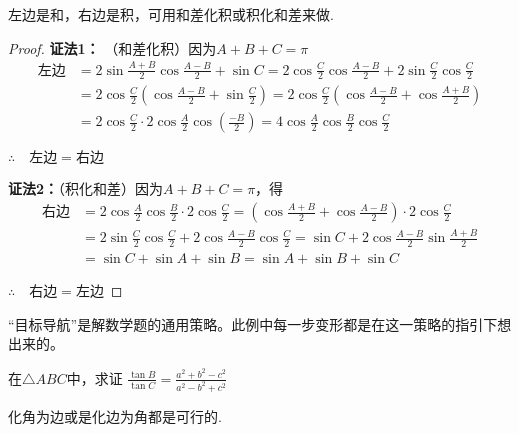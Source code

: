 \begin{analyze}
左边是和，右边是积，可用和差化积或积化和差来做.
\end{analyze}

\begin{proof}
\textbf{证法1：} （和差化积）因为$A+B+C=\pi$
\[\begin{split}
\text{左边}&=2\sin\frac{A+B}{2}\cos\frac{A-B}{2}+\sin C=2\cos\frac{C}{2}\cos\frac{A-B}{2}+2\sin\frac{C}{2}\cos\frac{C}{2}\\
&=2\cos\frac{C}{2}\left(\cos\frac{A-B}{2}+\sin\frac{C}{2}\right)=2\cos\frac{C}{2}\left(\cos\frac{A-B}{2}+\cos\frac{A+B}{2}\right)\\
&=2\cos\frac{C}{2}\cdot 2\cos\frac{A}{2}\cos\left(\frac{-B}{2}\right)=4\cos\frac{A}{2}\cos\frac{B}{2}\cos\frac{C}{2}
\end{split}\]

$\therefore\quad \text{左边}=\text{右边}$

\textbf{证法2：}（积化和差）因为$A+B+C=\pi$，得
\[\begin{split}
\text{右边}&=2\cos\frac{A}{2}\cos\frac{B}{2}\cdot 2\cos\frac{C}{2}=\left(\cos\frac{A+B}{2}+\cos\frac{A-B}{2}\right)\cdot 2\cos\frac{C}{2}\\
&=2\sin\frac{C}{2}\cos\frac{C}{2}+2\cos\frac{A-B}{2}\cos\frac{C}{2}=\sin C+2\cos\frac{A-B}{2}\sin\frac{A+B}{2}\\
&=\sin C+\sin A+\sin B=\sin A+\sin B+\sin C
\end{split}\]

$\therefore\quad \text{右边}=\text{左边}$
\end{proof}

\begin{remark}
“目标导航”是解数学题的通用策略。此例中每一步变形都是在这一策略的指引下想出来的。
\end{remark}

\begin{example}
    在$\triangle ABC$中，求证 $\frac{\tan B}{\tan C}=\frac{a^2+b^2-c^2}{a^2-b^2+c^2}$
\end{example}

\begin{analyze}
化角为边或是化边为角都是可行的.
\end{analyze}

